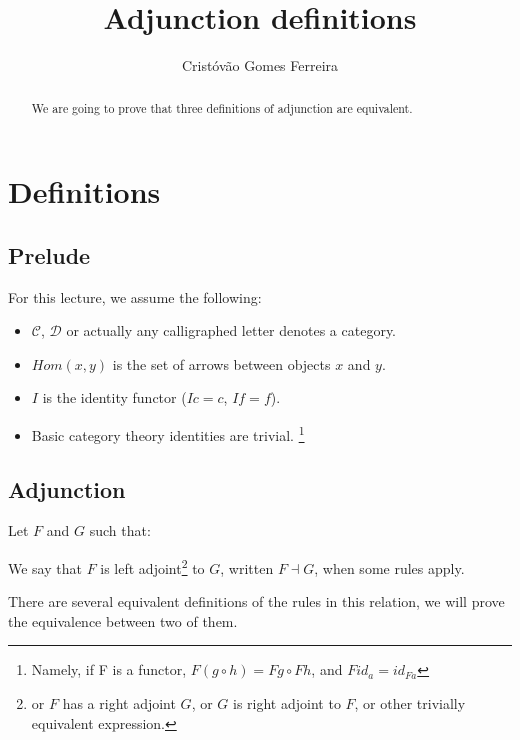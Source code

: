 \documentclass[]{article}
\title{Adjunction definitions}
\author{Cristóvão Gomes Ferreira}
\begin{document}
\newcommand{\blackqed}{
	\renewcommand{\qedsymbol}{$\blacksquare$}
	\qed
	\renewcommand{\qedsymbol}{$\square$}
}

\maketitle

\begin{abstract}
We are going to prove that three definitions of adjunction are equivalent.
\end{abstract}

\section{Definitions}

\subsection{Prelude}

For this lecture, we assume the following:

\begin{itemize}
	\item $\mathcal{C}$, $\mathcal{D}$ or actually any calligraphed letter denotes a category.
	\item $Hom(x,y)$ is the set of arrows between objects $x$ and $y$.
	\item $I$ is the identity functor ($Ic=c$, $If=f$).
	\item Basic category theory identities are trivial. \footnote{Namely, if F is a functor, $F(g \circ h) = Fg \circ Fh$, and $F id_a = id_{Fa}$}
\end{itemize}

\subsection{Adjunction}

Let $F$ and $G$ such that:


We say that $F$ is left adjoint\footnote{or $F$ has a right adjoint $G$, or $G$ is right adjoint to $F$, or other trivially equivalent expression.} to $G$, written $F \dashv G$, when some rules apply.

There are several equivalent definitions of the rules in this relation, we will prove the equivalence between two of them.
\end{document}
